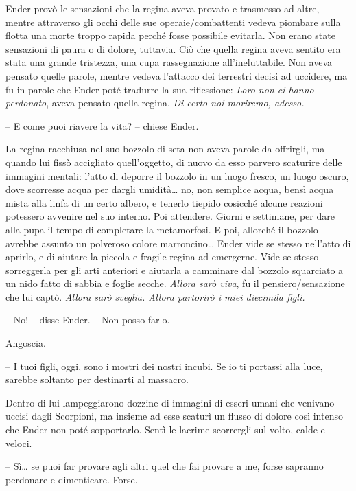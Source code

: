{Ender provò le sensazioni che la regina aveva provato e trasmesso ad
	altre, mentre attraverso gli occhi delle sue operaie/combattenti vedeva
	piombare sulla flotta una morte troppo rapida perché fosse possibile
	evitarla. Non erano state sensazioni di paura o di dolore, tuttavia. Ciò
	che quella regina aveva sentito era stata una grande tristezza, una cupa
	rassegnazione all'ineluttabile. Non aveva pensato quelle parole, mentre
	vedeva l'attacco dei terrestri decisi ad uccidere, ma fu in parole che
	Ender poté tradurre la sua riflessione: \emph{Loro non ci hanno
		perdonato}, \emph{} aveva pensato quella regina. \emph{Di certo noi
		moriremo, adesso.}}

{-- E come puoi riavere la vita? -- chiese Ender.}

{La regina racchiusa nel suo bozzolo di seta non aveva parole da
	offrirgli, ma quando lui fissò accigliato quell'oggetto, di nuovo da
	esso parvero scaturire delle immagini mentali: l'atto di deporre il
	bozzolo in un luogo fresco, un luogo oscuro, dove scorresse acqua per
	dargli umidità\ldots{} no, non semplice acqua, bensì acqua mista alla
	linfa di un certo albero, e tenerlo tiepido cosicché alcune reazioni
	potessero avvenire nel suo interno. Poi attendere. Giorni e settimane,
	per dare alla pupa il tempo di completare la metamorfosi. E poi,
	allorché il bozzolo avrebbe assunto un polveroso colore
	marroncino\ldots{} Ender vide se stesso nell'atto di aprirlo, e di
	aiutare la piccola e fragile regina ad emergerne. Vide se stesso
	sorreggerla per gli arti anteriori e aiutarla a camminare dal bozzolo
	squarciato a un nido fatto di sabbia e foglie secche. \emph{Allora sarò
		viva}, \emph{} fu il pensiero/sensazione che lui captò. \emph{Allora
		sarò sveglia. Allora partorirò i miei diecimila figli.}}

{-- No! -- disse Ender. -- Non posso farlo.}

{Angoscia.}

{-- I tuoi figli, oggi, sono i mostri dei nostri incubi. Se io ti
	portassi alla luce, sarebbe soltanto per destinarti al massacro.}

{Dentro di lui lampeggiarono dozzine di immagini di esseri umani che
	venivano uccisi dagli Scorpioni, ma insieme ad esse scaturì un flusso di
	dolore così intenso che Ender non poté sopportarlo. Sentì le lacrime
	scorrergli sul volto, calde e veloci.}

{-- Sì\ldots{} se puoi far provare agli altri quel che fai provare a me,
	forse sapranno perdonare e dimenticare. Forse.}

